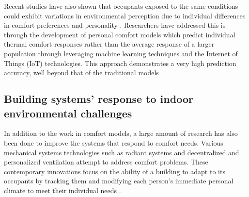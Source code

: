 \documentclass[]{interact}
\theoremstyle{plain}%
\theoremstyle{definition}
\theoremstyle{remark}
\begin{document}

Recent studies have also shown that occupants exposed to the same conditions could exhibit variations in environmental perception due to individual differences in comfort preferences and personality \citep{cheung2019analysis, livcina2018development}. Researchers have addressed this is through the development of personal comfort models which predict individual thermal comfort responses rather than the average response of a larger population \citep{kim2018personal} through leveraging  machine learning techniques and the Internet of Things (IoT) technologies. This approach demonstrates a very high prediction accuracy, well beyond that of the traditional models \citep{kim2018personal1}.





\subsection{Building systems’ response to indoor environmental challenges}
In addition to the work in comfort models, a large amount of research has also been done to improve the systems that respond to comfort needs. Various mechanical systems technologies such as radiant systems and decentralized and personalized ventilation attempt to address comfort problems. These contemporary innovations focus on the ability of a building to adapt to its occupants by tracking them and modifying each person's immediate personal climate to meet their individual needs \citep{Brager2015EvolvingComfort}. 
\end{document}
